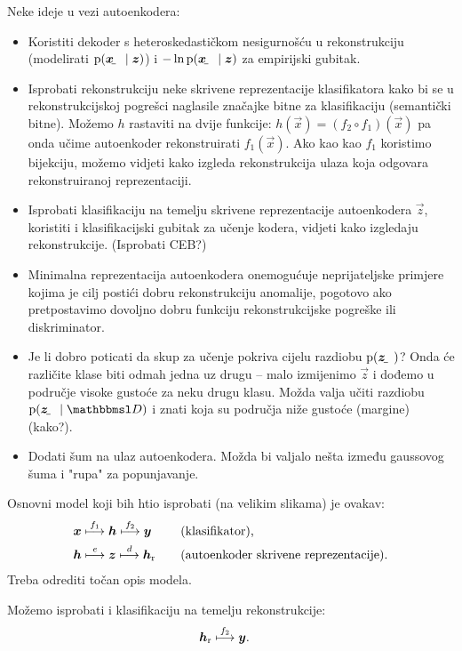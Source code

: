 \documentclass{article}
\begin{document}
Neke ideje u vezi autoenkodera:
\begin{itemize}
    \item Koristiti dekoder s heteroskedastičkom \citep{Kendall:2017:WUNBDLCV} nesigurnošću u rekonstrukciju (modelirati $\p(\rvec x\mid \vec z)$) i $-\ln\p(\rvec x\mid \vec z)$ za empirijski gubitak.
    \item Isprobati rekonstrukciju neke skrivene reprezentacije klasifikatora kako bi se u rekonstrukcijskoj pogrešci naglasile značajke bitne za klasifikaciju (semantički bitne). Možemo $h$ rastaviti na dvije funkcije: $h(\vec x) = (f_2\circ f_1)(\vec x)$ pa onda učime autoenkoder rekonstruirati $f_1(\vec x)$. Ako kao kao $f_1$ koristimo bijekciju, možemo vidjeti kako izgleda rekonstrukcija ulaza koja odgovara rekonstruiranoj reprezentaciji.
    \item Isprobati klasifikaciju na temelju skrivene reprezentacije autoenkodera $\vec z$, koristiti i klasifikacijski gubitak za učenje kodera, vidjeti kako izgledaju rekonstrukcije. (Isprobati CEB?)
    \item Minimalna reprezentacija autoenkodera onemogućuje neprijateljske primjere kojima je cilj postići dobru rekonstrukciju anomalije, pogotovo ako pretpostavimo dovoljno dobru funkciju rekonstrukcijske pogreške ili diskriminator.
    \item Je li dobro poticati da skup za učenje pokriva cijelu razdiobu $\p(\rvec z)$? Onda će različite klase biti odmah jedna uz drugu -- malo izmijenimo $\vec z$ i dođemo u područje visoke gustoće za neku drugu klasu. Možda valja učiti razdiobu $\p(\rvec z\mid \set D)$ i znati koja su područja niže gustoće (margine) (kako?).
    \item Dodati šum na ulaz autoenkodera. Možda bi valjalo nešta između gaussovog šuma i "rupa" za popunjavanje.
\end{itemize}

Osnovni model koji bih htio isprobati (na velikim slikama) je ovakav:
\begin{alignat}{3}
    &\vec x \overset{f_1}{\longmapsto} \vec h \overset{f_2}{\longmapsto} \vec y 
    \quad&&\text{(klasifikator)} \text, \\
    &\vec h \overset{e}{\longmapsto} \vec z \overset{d}{\longmapsto} \vec h_\text{r}
    \quad&&\text{(autoenkoder skrivene reprezentacije)} \text.
\end{alignat}
Treba odrediti točan opis modela.

Možemo isprobati i klasifikaciju na temelju rekonstrukcije:
\begin{align}
    &\vec h_\text{r} \overset{f_2}{\longmapsto} \vec y\text.
\end{align}
\end{document}
